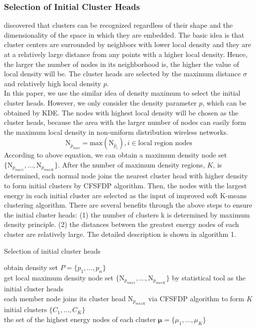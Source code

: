 \documentclass[11pt]{report}
\newcommand{\mb}{\mathbf}
\begin{document}
	\subsubsection{Selection of Initial Cluster Heads}
	 
	 \cite{Rodriguez1492} discovered that clusters can be recognized regardless of their shape and the dimensionality of the space in which they are embedded. The basic idea is that cluster centers are surrounded by neighbors with lower local density and they are at a relatively large distance from any points with a higher local density. Hence, the larger the number of nodes in its neighborhood is, the higher the value of local density will be. The cluster heads are selected by the maximum distance $\sigma$ and relatively high local density $p$.\\
	 
	 \noindent In this paper, we use the similar idea of density maximum to select the initial cluster heads. However, we only consider the density parameter $p$, which can be obtained by KDE. The nodes with highest local density will be chosen as the cluster heads, because the area with the larger number of nodes can easily form the maximum local density in non-uniform distribution wireless networks.
	 \begin{equation}
	 	\text{N}_{p_{max}} = \text{max}\left(\text{N}_{\hat{p}_i}\right), i \in \text{local region nodes}
	 \end{equation}
	  According to above equation, we can obtain a maximum density node set $\{\text{N}_{p_{max1}},\dots,\text{N}_{p_{maxK}}\}$. After the number of maximum density regions, $K$, is determined, each normal node joins the nearest cluster head with higher density to form initial clusters by CFSFDP algorithm. Then, the nodes with the largest energy in each initial cluster are selected as the input of improved soft K-means clustering algorithm. There are several benefits through the above steps to ensure the initial cluster heads: (1) the number of clusters k is determined by maximum density principle. (2) the distances between the greatest energy nodes of each cluster are relatively large. The detailed description is shown in algorithm 1. 
	 
	 \begin{algorithm}[H]
	 	\caption{Selection of initial cluster heads}
	 	\label{alg1} 
	 	\LinesNumbered %
	 	\KwIn{the set of $n$ data items $\mb{X} = \{x_1,x_2,\dots,x_n\}$}
	 	obtain density set $P = \{p_1,\dots,p_n\}$ \\
	 	get local maximum density node set $\{\text{N}_{p_{max1}},\dots,\text{N}_{p_{maxK}}\}$ by statistical tool as the initial cluster heads\\
	 	each member node joins its cluster head $\text{N}_{p_{maxK}}$ via CFSFDP algorithm to form $K$ initial clusters $\{C_1,\dots, C_K\}$\\
	 	the set of the highest energy nodes of each cluster $\bm{\mu} = \{\mu_1,\dots,\mu_K\}$
	 \end{algorithm}
	
\end{document}

